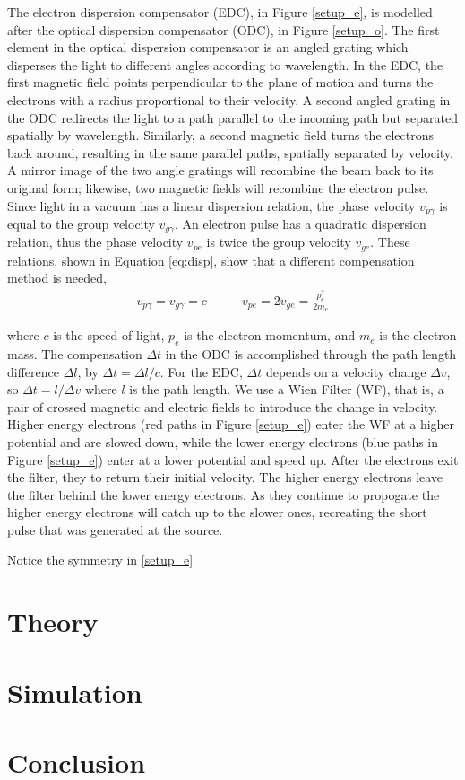 \documentclass[12pt,letterpaper]{article}
\newcommand{\eqqref}[1]{Equation \ref{#1}}
\begin{document}
The electron dispersion compensator (EDC), in Figure \ref{setup_e}, is modelled after the optical dispersion compensator (ODC), in Figure \ref{setup_o}.  
The first element in the optical dispersion compensator is an angled grating which disperses the light to different angles according to wavelength.  
In the EDC, the first magnetic field points perpendicular to the plane of motion and turns the electrons with a radius proportional to their velocity. 
A second angled grating in the ODC redirects the light to a path parallel to the incoming path but separated spatially by wavelength. 
Similarly, a second magnetic field turns the electrons back around, resulting in the same parallel paths, spatially separated by velocity. 
A mirror image of the two angle gratings will recombine the beam back to its original form; likewise, two magnetic fields will recombine the electron pulse. 
Since light in a vacuum has a linear dispersion relation, the phase velocity $v_{p\gamma}$ is equal to the group velocity $v_{g\gamma}$. 
An electron pulse has a quadratic dispersion relation, thus the phase velocity $v_{pe}$ is twice the group velocity $v_{ge}$. 
These relations, shown in \eqqref{eq:disp}, show that a different compensation method is needed,
\begin{align}
   \label{eq:disp}
v_{p\gamma} = v_{g\gamma}=c &\qquad  v_{pe} = 2 v_{ge} = \frac{p_e^2}{2m_e}
\end{align}

where $c$ is the speed of light, $p_e$ is the electron momentum, and $m_e$ is the electron mass. 
The compensation $\Delta t$ in the ODC is accomplished through the path length difference $\Delta l$, by $\Delta t=\Delta l/c$. 
For the EDC, $\Delta t$ depends on a velocity change $\Delta v$, so $\Delta t = l/\Delta v$ where $l$ is the path length. 
We use a Wien Filter (WF), that is, a pair of crossed magnetic and electric fields to introduce the change in velocity. 
Higher energy electrons (red paths in Figure \ref{setup_e}) enter the WF at a higher potential and are slowed down, while the lower energy electrons (blue paths in Figure \ref{setup_e}) enter at a lower potential and speed up. 
After the electrons exit the filter, they to return their initial velocity.
The higher energy electrons leave the filter behind the lower energy electrons.
As they continue to propogate the higher energy electrons will catch up to the slower ones, recreating the short pulse that was generated at the source. 

Notice the symmetry in \ref{setup_e}

\section{Theory}


\section{Simulation}

\section{Conclusion}
\end{document}
